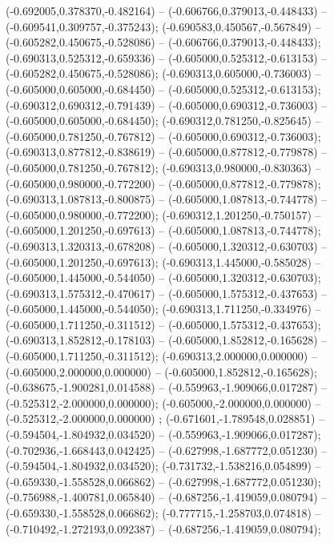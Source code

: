  (-0.692005,0.378370,-0.482164) -- (-0.606766,0.379013,-0.448433) -- (-0.609541,0.309757,-0.375243);
 (-0.690583,0.450567,-0.567849) -- (-0.605282,0.450675,-0.528086) -- (-0.606766,0.379013,-0.448433);
 (-0.690313,0.525312,-0.659336) -- (-0.605000,0.525312,-0.613153) -- (-0.605282,0.450675,-0.528086);
 (-0.690313,0.605000,-0.736003) -- (-0.605000,0.605000,-0.684450) -- (-0.605000,0.525312,-0.613153);
 (-0.690312,0.690312,-0.791439) -- (-0.605000,0.690312,-0.736003) -- (-0.605000,0.605000,-0.684450);
 (-0.690312,0.781250,-0.825645) -- (-0.605000,0.781250,-0.767812) -- (-0.605000,0.690312,-0.736003);
 (-0.690313,0.877812,-0.838619) -- (-0.605000,0.877812,-0.779878) -- (-0.605000,0.781250,-0.767812);
 (-0.690313,0.980000,-0.830363) -- (-0.605000,0.980000,-0.772200) -- (-0.605000,0.877812,-0.779878);
 (-0.690313,1.087813,-0.800875) -- (-0.605000,1.087813,-0.744778) -- (-0.605000,0.980000,-0.772200);
 (-0.690312,1.201250,-0.750157) -- (-0.605000,1.201250,-0.697613) -- (-0.605000,1.087813,-0.744778);
 (-0.690313,1.320313,-0.678208) -- (-0.605000,1.320312,-0.630703) -- (-0.605000,1.201250,-0.697613);
 (-0.690313,1.445000,-0.585028) -- (-0.605000,1.445000,-0.544050) -- (-0.605000,1.320312,-0.630703);
 (-0.690313,1.575312,-0.470617) -- (-0.605000,1.575312,-0.437653) -- (-0.605000,1.445000,-0.544050);
 (-0.690313,1.711250,-0.334976) -- (-0.605000,1.711250,-0.311512) -- (-0.605000,1.575312,-0.437653);
 (-0.690313,1.852812,-0.178103) -- (-0.605000,1.852812,-0.165628) -- (-0.605000,1.711250,-0.311512);
 (-0.690313,2.000000,0.000000) -- (-0.605000,2.000000,0.000000) -- (-0.605000,1.852812,-0.165628);
 (-0.638675,-1.900281,0.014588) -- (-0.559963,-1.909066,0.017287) -- (-0.525312,-2.000000,0.000000);
 (-0.605000,-2.000000,0.000000) -- (-0.525312,-2.000000,0.000000) ;
 (-0.671601,-1.789548,0.028851) -- (-0.594504,-1.804932,0.034520) -- (-0.559963,-1.909066,0.017287);
 (-0.702936,-1.668443,0.042425) -- (-0.627998,-1.687772,0.051230) -- (-0.594504,-1.804932,0.034520);
 (-0.731732,-1.538216,0.054899) -- (-0.659330,-1.558528,0.066862) -- (-0.627998,-1.687772,0.051230);
 (-0.756988,-1.400781,0.065840) -- (-0.687256,-1.419059,0.080794) -- (-0.659330,-1.558528,0.066862);
 (-0.777715,-1.258703,0.074818) -- (-0.710492,-1.272193,0.092387) -- (-0.687256,-1.419059,0.080794);
